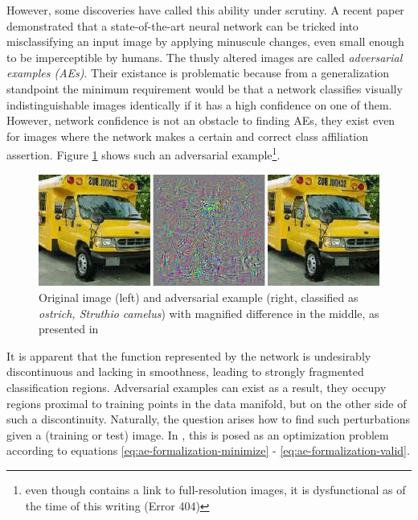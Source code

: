 \documentclass[11pt, a4paper]{article}
\begin{document}
However, some discoveries have called this ability under scrutiny. A recent paper \cite{intriguing-properties-of-neural-networks} demonstrated that a state-of-the-art neural network can be tricked into misclassifying an input image by applying minuscule changes, even small enough to be imperceptible by humans. The thusly altered images are called \emph{adversarial examples (AEs)}. Their existance is problematic because from a generalization standpoint the minimum requirement would be that a network classifies visually indistinguishable images identically if it has a high confidence on one of them. However, network confidence is not an obstacle to finding AEs, they exist even for images where the network makes a certain and correct class affiliation assertion. Figure \ref{fig:intriguing-properties-ae} shows such an adversarial example\footnote{even though \cite{intriguing-properties-of-neural-networks} contains a link to full-resolution images, it is dysfunctional as of the time of this writing (Error 404)}.

\begin{figure}[h!tb]
\centering
	\includegraphics[width=\textwidth]{images/intruiging_properties_ae.png}
	\caption[Adversarial example from \cite{intriguing-properties-of-neural-networks}]{Original image (left) and adversarial example (right, classified as \emph{ostrich, Struthio
camelus}) with magnified difference in the middle, as presented in \cite{intriguing-properties-of-neural-networks}}
	\label{fig:intriguing-properties-ae}
\end{figure}

It is apparent that the function represented by the network is undesirably discontinuous and lacking in smoothness, leading to strongly fragmented classification regions. Adversarial examples can exist as a result, they occupy regions proximal to training points in the data manifold, but on the other side of such a discontinuity. Naturally, the question arises how to find such perturbations given a (training or test) image. In \cite{intriguing-properties-of-neural-networks}, this is posed as an optimization problem according to equations \eqref{eq:ae-formalization-minimize} - \eqref{eq:ae-formalization-valid}.
\end{document}
